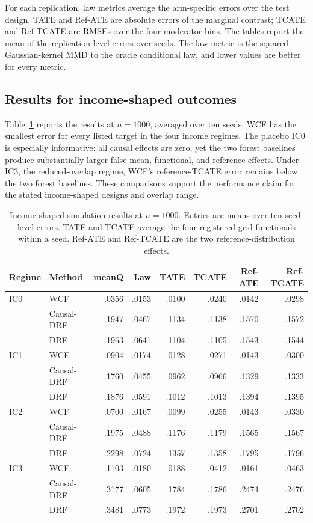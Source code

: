 For each replication, law metrics average the arm-specific errors over the
test design. TATE and Ref-ATE are absolute errors of the marginal contrast;
TCATE and Ref-TCATE are RMSEs over the four moderator bins. The tables report
the mean of the replication-level errors over seeds. The law metric is the
squared Gaussian-kernel MMD to the oracle conditional law, and lower values
are better for every metric.

\subsection{Results for income-shaped outcomes}

Table~\ref{tab:revision-income} reports the results at $n=1000$, averaged
over ten seeds. WCF has the smallest error for every listed target in the
four income regimes. The placebo IC0 is especially informative: all causal
effects are zero, yet the two forest baselines produce substantially larger
false mean, functional, and reference effects. Under IC3, the reduced-overlap
regime, WCF's reference-TCATE error remains below the two forest baselines.
These comparisons support the performance claim for the stated income-shaped
designs and overlap range.

\begin{table}[t]
\centering\scriptsize
\caption{Income-shaped simulation results at $n=1000$. Entries are means over
ten seed-level errors. TATE and TCATE average the four registered grid
functionals within a seed. Ref-ATE and Ref-TCATE are the two
reference-distribution effects.}
\label{tab:revision-income}
\begin{tabular}{llrrrrrr}
\toprule
Regime & Method & meanQ & Law & TATE & TCATE & Ref-ATE & Ref-TCATE\\
\midrule
IC0 & WCF & .0356 & .0153 & .0100 & .0240 & .0142 & .0298\\
    & Causal-DRF & .1947 & .0467 & .1134 & .1138 & .1570 & .1572\\
    & DRF & .1963 & .0641 & .1104 & .1105 & .1543 & .1544\\
IC1 & WCF & .0904 & .0174 & .0128 & .0271 & .0143 & .0300\\
    & Causal-DRF & .1760 & .0455 & .0962 & .0966 & .1329 & .1333\\
    & DRF & .1876 & .0591 & .1012 & .1013 & .1394 & .1395\\
IC2 & WCF & .0700 & .0167 & .0099 & .0255 & .0143 & .0330\\
    & Causal-DRF & .1975 & .0488 & .1176 & .1179 & .1565 & .1567\\
    & DRF & .2298 & .0724 & .1357 & .1358 & .1795 & .1796\\
IC3 & WCF & .1103 & .0180 & .0188 & .0412 & .0161 & .0463\\
    & Causal-DRF & .3177 & .0605 & .1784 & .1786 & .2474 & .2476\\
    & DRF & .3481 & .0773 & .1972 & .1973 & .2701 & .2702\\
\bottomrule
\end{tabular}
\end{table}

